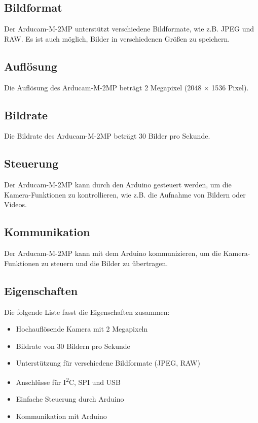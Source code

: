 \subsection{Bildformat}

Der Arducam-M-2MP unterstützt verschiedene Bildformate, wie z.B. JPEG und RAW. Es ist auch möglich, Bilder in verschiedenen Größen zu speichern.

\subsection{Auflösung}

Die Auflösung des Arducam-M-2MP beträgt 2 Megapixel (2048 $\times$ 1536 Pixel). 

\subsection{Bildrate}

Die Bildrate des Arducam-M-2MP beträgt 30 Bilder pro Sekunde.

\subsection{Steuerung}

Der Arducam-M-2MP kann durch den Arduino gesteuert werden, um die Kamera-Funktionen zu kontrollieren, wie z.B. die Aufnahme von Bildern oder Videos.

\subsection{Kommunikation}

Der Arducam-M-2MP kann mit dem Arduino kommunizieren, um die Kamera-Funktionen zu steuern und die Bilder zu übertragen.


\subsection{Eigenschaften}

Die folgende Liste fasst die Eigenschaften zusammen:

\begin{itemize}
  \item Hochauflösende Kamera mit 2 Megapixeln
  \item Bildrate von 30 Bildern pro Sekunde
  \item Unterstützung für verschiedene Bildformate (JPEG, RAW)
  \item Anschlüsse für I\textsuperscript{2}C, SPI und USB
  \item Einfache Steuerung durch Arduino
  \item Kommunikation mit Arduino
\end{itemize}

